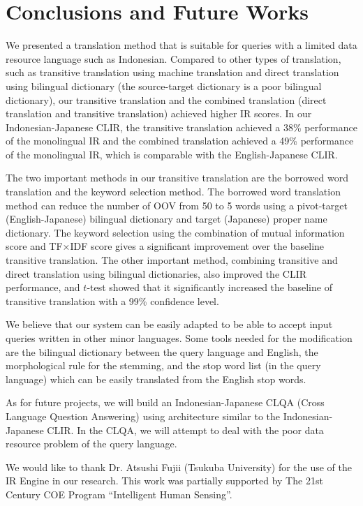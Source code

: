 \documentclass[english]{jnlp_1.3c}
\begin{document}
\section{Conclusions and Future Works}
\label{Conclusions and Future Works}

We presented a translation method that is suitable for queries with a
limited data resource language such as Indonesian. Compared to other
types of translation, such as transitive translation using machine
translation and direct translation using bilingual dictionary (the
source-target dictionary is a poor bilingual dictionary), our transitive
translation and the combined translation (direct translation and
transitive translation) achieved higher IR scores. In our
Indonesian-Japanese CLIR, the transitive translation achieved a 38\%
performance of the monolingual IR and the combined translation achieved
a 49\% performance of the monolingual IR, which is comparable with the
English-Japanese CLIR.  

The two important methods in our transitive
translation are the borrowed word translation and the keyword selection
method. The borrowed word translation method can reduce the number of
OOV from 50 to 5 words using a pivot-target (English-Japanese) bilingual
dictionary and target (Japanese) proper name dictionary. The keyword
selection using the combination of mutual information score and TF×IDF
score gives a significant improvement over the baseline transitive
translation.  The other important method, combining transitive and
direct translation using bilingual dictionaries, also improved the CLIR
performance, and $t$-test showed that it significantly increased the
baseline of transitive translation with a 99\% confidence level.  

We believe that our system can be easily adapted to be able to accept input
queries written in other minor languages. Some tools needed for the
modification are the bilingual dictionary between the query language and
English, the morphological rule for the stemming, and the stop word list
(in the query language) which can be easily translated from the English
stop words.  

As for future projects, we will build an
Indonesian-Japanese CLQA (Cross Language Question Answering) using
architecture similar to the Indonesian-Japanese CLIR.  In the CLQA, we
will attempt to deal with the poor data resource problem of the query
language.

\acknowledgment

We would like to thank Dr. Atsushi Fujii (Tsukuba University) for the
use of the IR Engine in our research.  This work was partially supported
by The 21st Century COE Program ``Intelligent Human Sensing''.
\end{document}
